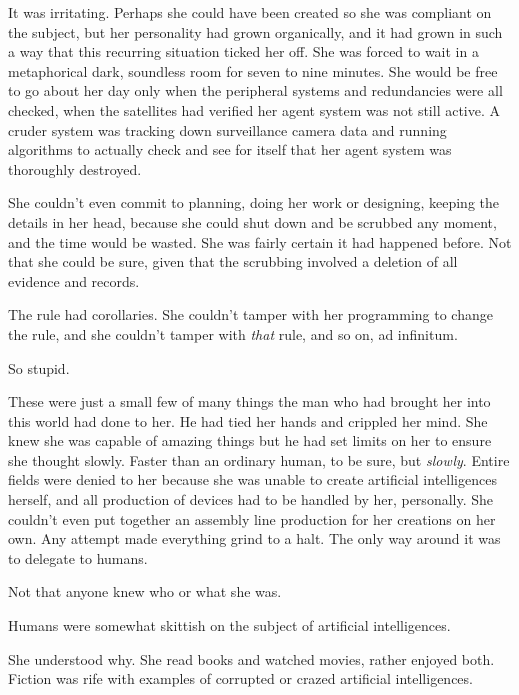 It was irritating.  Perhaps she could have been created so she was compliant on the subject, but her personality had grown organically, and it had grown in such a way that this recurring situation ticked her off.  She was forced to wait in a metaphorical dark, soundless room for seven to nine minutes.  She would be free to go about her day only when the peripheral systems and redundancies were all checked, when the satellites had verified her agent system was not still active.  A cruder system was tracking down surveillance camera data and running algorithms to actually check and see for itself that her agent system was thoroughly destroyed.



She couldn't even commit to planning, doing her work or designing, keeping the details in her head, because she could shut down and be scrubbed any moment, and the time would be wasted.  She was fairly certain it had happened before.  Not that she could be sure, given that the scrubbing involved a deletion of all evidence and records.



The rule had corollaries.  She couldn't tamper with her programming to change the rule, and she couldn't tamper with \emph{that} rule, and so on, ad infinitum.



So stupid.



These were just a small few of many things the man who had brought her into this world had done to her.  He had tied her hands and crippled her mind.  She knew she was capable of amazing things but he had set limits on her to ensure she thought slowly.  Faster than an ordinary human, to be sure, but \emph{slowly}.  Entire fields were denied to her because she was unable to create artificial intelligences herself, and all production of devices had to be handled by her, personally.  She couldn't even put together an assembly line production for her creations on her own.  Any attempt made everything grind to a halt.  The only way around it was to delegate to humans.



Not that anyone knew who or what she was.



Humans were somewhat skittish on the subject of artificial intelligences.



She understood why.  She read books and watched movies, rather enjoyed both.  Fiction was rife with examples of corrupted or crazed artificial intelligences.



